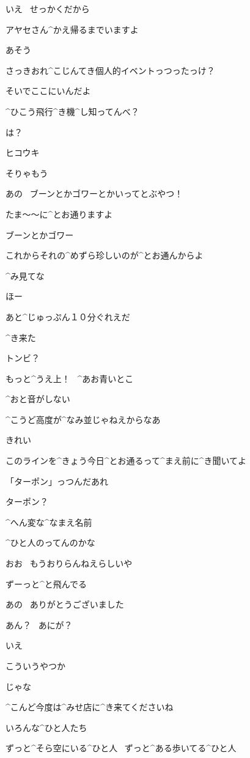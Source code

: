 \A いえ
\ せっかくだから

\A アヤセさん^{かえ}{帰}るまでいますよ

\Y あそう

\Y さっきおれ^{こじんてき}{個人的}イベントっつったっけ？

\Y そいでここにいんだよ

\page
\Y ^{ひこう}{飛行}^{き}{機}^{し}{知}ってんべ？

\A は？

\A ヒコウキ

\A そりゃもう

\A あの
\ ブーンとかゴワーとかいってとぶやつ！

\A たま〜〜に^{とお}{通}りますよ

\Y ブーンとかゴワー

\Y これからそれの^{めずら}{珍}しいのが^{とお}{通}んからよ

\Y ^{み}{見}てな

\A ほー

\Y あと^{じゅっぷん}{１０分}ぐれえだ

\page
\Y ^{き}{来}た

\A トンビ？

\Y もっと^{うえ}{上}！
\ ^{あお}{青}いとこ

\page[76]
\A ^{おと}{音}がしない

\Y ^{こうど}{高度}が^{なみ}{並}じゃねえからなあ

\A きれい

\Y このラインを^{きょう}{今日}^{とお}{通}るって^{まえ}{前}に^{き}{聞}いてよ

\page
\Y 「ターポン」っつんだあれ

\A ターポン？

\A ^{へん}{変}な^{なまえ}{名前}

\A ^{ひと}{人}のってんのかな

\Y おお
\ もうおりらんねえらしいや

\Y ずーっと^{と}{飛}んでる

\page[80]
\A あの
\ ありがとうございました

\Y あん？
\ あにが？

\A いえ

\Y こういうやつか

\page
\Y じゃな

\A ^{こんど}{今度}は^{みせ}{店}に^{き}{来}てくださいね

\page
\A いろんな^{ひと}{人}たち

\A ずっと^{そら}{空}にいる^{ひと}{人}
\ ずっと^{ある}{歩}いてる^{ひと}{人}

